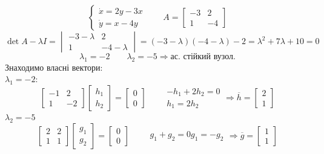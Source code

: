 \begin{example}
    $$
    \begin{cases}
    \dot{x} = 2y - 3x\\
    \dot{y} = x - 4y
    \end{cases} \qquad A = \begin{bmatrix}
     -3 & 2 \\
     1 & -4
    \end{bmatrix}
    $$
    $$
    \det{A - \lambda I} = \begin{vmatrix}
      -3 - \lambda & 2 \\
      1 & -4 - \lambda
    \end{vmatrix}  = (-3-\lambda) (-4 - \lambda) -2 = \lambda^2 + 7 \lambda + 10 = 0
    $$
    $$
    \lambda_1 = -2 \qquad \lambda_2 = -5 \Rightarrow \text{ас. стійкий вузол.}
    $$
    Знаходимо власні вектори:\\
    $\lambda_1 = -2$:
    $$
    \begin{bmatrix}
     -1 & 2 \\
     1 & -2
    \end{bmatrix} \begin{bmatrix}
     h_1 \\
     h_2
    \end{bmatrix} = \begin{bmatrix}
     0 \\
     0
    \end{bmatrix} \qquad \begin{gathered}
     -h_1 + 2h_2 = 0\\
     h_1 = 2 h_2
    \end{gathered} \Rightarrow \overline{h} = \begin{bmatrix}
     2 \\
     1
    \end{bmatrix}
    $$
    $\lambda_2 = -5$
    $$
    \begin{bmatrix}
     2 & 2 \\
     1 & 1
    \end{bmatrix} \begin{bmatrix}
     g_1 \\
     g_2
    \end{bmatrix} = \begin{bmatrix}
     0 \\
     0
    \end{bmatrix}
    \qquad \begin{gathered}
     g_1 + g_2 = 0
     g_1 = - g_2
    \end{gathered} \Rightarrow \overline{g} = \begin{bmatrix}
     1 \\
     1
    \end{bmatrix}
    $$
\end{example}
